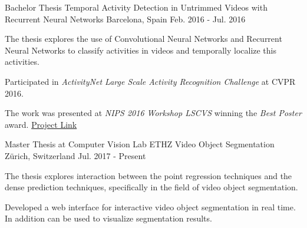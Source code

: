 
\begin{cventries}

\cventry
	{Bachelor Thesis}
  {Temporal Activity Detection in Untrimmed Videos with Recurrent Neural Networks}
	{Barcelona, Spain}
	{Feb. 2016 - Jul. 2016}
  {
    \begin{cvitems}
    \item{
      The thesis explores the use of Convolutional Neural Networks and Recurrent
      Neural Networks to classify activities in videos and temporally localize
      this activities.}
    \item{
      Participated in \emph{ActivityNet Large Scale Activity Recognition
      Challenge} at CVPR 2016.}
		\item{The work was presented at \emph{NIPS 2016 Workshop LSCVS} winning the
		  \emph{Best Poster} award.
      \href{https://imatge-upc.github.io/activitynet-2016-cvprw/}{Project Link}}
    \end{cvitems}
}

\cventry
	{Master Thesis at Computer Vision Lab ETHZ}
	{Video Object Segmentation}
	{Z\"urich, Switzerland}
	{Jul. 2017 - Present}
	{
    \begin{cvitems}
    \item{
      The thesis explores interaction between the point regression techniques
      and the dense prediction techniques, specifically in the field of
      video object segmentation.}
    \item{
      Developed a web interface for interactive video object segmentation in
      real time. In addition can be used to visualize segmentation results.
      }
    \end{cvitems}
  }

\end{cventries}


\begin{cvhonors}


\end{cvhonors}
% 
% 
% 
% 
